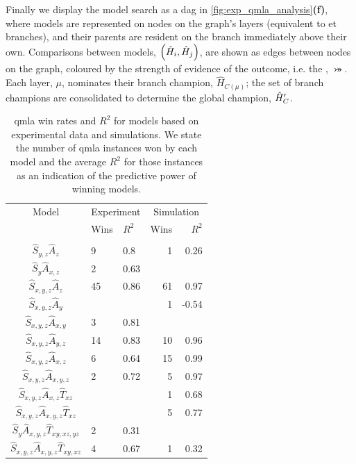 Finally we display the \gls{model search} as a \gls{dag} in \cref{fig:exp_qmla_analysis}\textbf{(f)}, 
    where models are represented on nodes on the graph's layers (equivalent to \gls{et} branches), 
    and their parents are resident on the branch immediately above their own.
Comparisons between models, $\left(\hat{H}_i, \hat{H}_j\right)$,  are shown as edges between nodes on the graph, 
    coloured by the strength of evidence of the outcome, i.e. the , $\bij$. 
Each layer, $\mu$, nominates their branch champion, $\hat{H}_{C(\mu)}$;
    the set of branch champions are consolidated to determine the global champion, $\hat{H}^{\prime}_C$. 
\setlength{\tabcolsep}{8pt}
\begin{table}[t]
    \centering
    \begin{tabular}{cllrr}
    \hline
        Model & \multicolumn{2}{c}{Experiment} & \multicolumn{2}{c}{Simulation}    \\
        & Wins   & $R^2$   & Wins   & $R^2$   \\
    \hline
    \\
        $\hat{S}_{y,z}\hat{A}_{z}$                      & 9      & 0.8     & 1      & 0.26    \\
        $\hat{S}_{y}\hat{A}_{x,z}$                      & 2      & 0.63    &        &         \\
        $\hat{S}_{x,y,z}\hat{A}_{z}$                    & 45     & 0.86    & 61     & 0.97    \\
        $\hat{S}_{x,y,z}\hat{A}_{y}$                    &        &         & 1      & -0.54   \\
        $\hat{S}_{x,y,z}\hat{A}_{x,y}$                  & 3      & 0.81    &        &         \\
        $\hat{S}_{x,y,z}\hat{A}_{y,z}$                  & 14     & 0.83    & 10     & 0.96    \\
        $\hat{S}_{x,y,z}\hat{A}_{x,z}$                  & 6      & 0.64    & 15     & 0.99    \\
        $\hat{S}_{x,y,z}\hat{A}_{x,y,z}$                & 2      & 0.72    & 5      & 0.97    \\
        $\hat{S}_{x,y,z}\hat{A}_{x,z}\hat{T}_{xz}$      &        &         & 1      & 0.68    \\
        $\hat{S}_{x,y,z}\hat{A}_{x,y,z}\hat{T}_{xz}$    &        &         & 5      & 0.77    \\
        $\hat{S}_{y}\hat{A}_{x,y,z}\hat{T}_{xy,xz,yz}$  & 2      & 0.31    &        &         \\
        $\hat{S}_{x,y,z}\hat{A}_{x,y,z}\hat{T}_{xy,xz}$ & 4      & 0.67    & 1      & 0.32    \\
    \hline
    \end{tabular}
    \caption[
        QMLA win rates and $R^2$ for models based on experimental data and simulations
    ]{
        \gls{qmla}  \glspl{win rate} and $R^2$ for models based on experimental data and simulations. 
        We state the number of \gls{qmla} \glspl{instance} won by each model and the average $R^2$ for those \glspl{instance} as an indication of the
        predictive power of winning models.
    }
    \label{table:win_rates_r_squareds}
\end{table}



